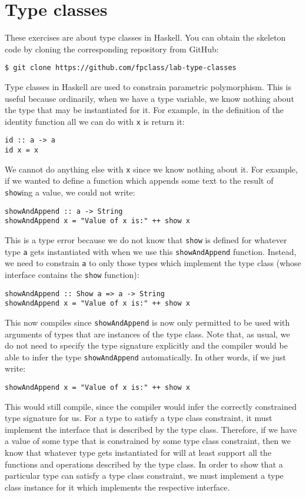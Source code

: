 \section{Type classes}

These exercises are about type classes in Haskell. You can obtain the skeleton code by cloning the corresponding repository from GitHub:
\begin{verbatim}
$ git clone https://github.com/fpclass/lab-type-classes
\end{verbatim}

Type classes in Haskell are used to constrain parametric polymorphism. This is useful because ordinarily, when we have a type variable, we know nothing about the type that may be instantiated for it. For example, in the definition of the identity function all we can do with \texttt{\small x} is return it:
\begin{verbatim}
id :: a -> a
id x = x
\end{verbatim} 
We cannot do anything else with \texttt{\small x} since we know nothing about it. For example, if we wanted to define a function which appends some text to the result of \texttt{\small show}ing a value, we could not write:
\begin{verbatim}
showAndAppend :: a -> String 
showAndAppend x = "Value of x is:" ++ show x
\end{verbatim}
This is a type error because we do not know that \texttt{\small show} is defined for whatever type \texttt{\small a} gets instantiated with when we use this \texttt{\small showAndAppend} function. Instead, we need to constrain \texttt{\small a} to only those types which implement the  type class (whose interface contains the \texttt{\small show} function):
\begin{verbatim}
showAndAppend :: Show a => a -> String 
showAndAppend x = "Value of x is:" ++ show x
\end{verbatim}
This now compiles since \texttt{\small showAndAppend} is now only permitted to be used with arguments of types that are instances of the  type class. Note that, as usual, we do not need to specify the type signature explicitly and the compiler would be able to infer the type \texttt{\small showAndAppend} automatically. In other words, if we just write:
\begin{verbatim}
showAndAppend x = "Value of x is:" ++ show x
\end{verbatim}
This would still compile, since the compiler would infer the correctly constrained type signature for us. For a type to satisfy a type class constraint, it must implement the interface that is described by the type class. Therefore, if we have a value of some type  that is constrained by some type class constraint, then we know that whatever type gets instantiated for  will at least support all the functions and operations described by the type class. In order to show that a particular type can satisfy a type class constraint, we must implement a type class instance for it which implements the respective interface.

